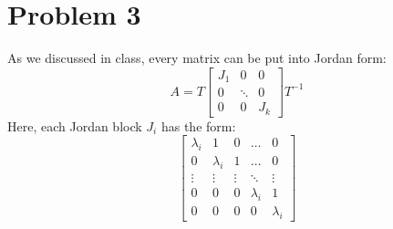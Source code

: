 \documentclass[11pt]{report}
\theoremstyle{definition}
\begin{document}
\section*{Problem 3}
As we discussed in class, every matrix can be put into Jordan form:
\[
A =
T
\begin{bmatrix}
J_1 & 0 & 0 \\
0 & \ddots & 0 \\
0 & 0 & J_k
\end{bmatrix}
T^{-1}
\]
Here, each Jordan block $J_i$ has the form:
\[
\begin{bmatrix}
\lambda_i & 1 & 0 & \dots & 0 \\
0 & \lambda_i & 1 & \dots & 0 \\
\vdots & \vdots & \vdots & \ddots & \vdots \\
0 & 0 & 0 & \lambda_i & 1 \\
0 & 0 & 0 & 0 & \lambda_i
\end{bmatrix}
\]
\end{document}
